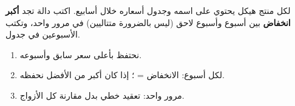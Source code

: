 \begin{statement}
لكل منتج هيكل يحتوي على اسمه وجدول أسعاره خلال  أسابيع. اكتب دالة  تجد \textbf{أكبر انخفاض} بين أسبوع وأسبوع لاحق (ليس بالضرورة متتاليين) في مرور واحد، وتكتب الأسبوعين في جدول.
\end{statement}
\begin{stepsbox}\begin{enumerate}
\item نحتفظ بأعلى سعر سابق  وأسبوعه.
\item لكل أسبوع: الانخفاض = ؛ إذا كان أكبر من الأفضل نحفظه.
\item مرور واحد: تعقيد خطي بدل مقارنة كل الأزواج.
\end{enumerate}\end{stepsbox}
